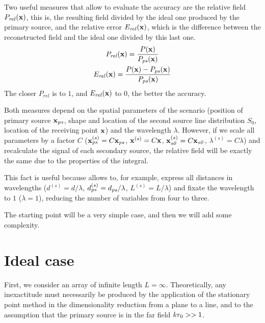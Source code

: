 Two useful measures that allow to evaluate the accuracy are the relative field $P_\mathit{rel}(\PosTheo)$, this is, the resulting field divided by the ideal one produced by the primary source, and the relative error $E_\mathit{rel}(\PosTheo)$, which is the difference between the reconstructed field and the ideal one divided by this last one.
\begin{gather}
	P_\mathit{rel}(\PosTheo) = \frac{P(\PosTheo)}{P_{\PosTheoSubInd[primarySource]}(\PosTheo)} \\
	E_\mathit{rel}(\PosTheo) = \frac{P(\PosTheo) - P_{\PosTheoSubInd[primarySource]}(\PosTheo)}{P_{\PosTheoSubInd[primarySource]}(\PosTheo)}
\end{gather}
The closer $P_\mathit{rel}$ is to $1$, and $E_\mathit{rel}(\PosTheo)$ to $0$, the better the accuracy.

Both measures depend on the spatial parameters of the scenario (position of primary source $\PosTheo[primarySource]$, shape and location of the second source line distribution $S_0$, location of the receiving point $\PosTheo$) and the wavelength $\lambda$. However, if we scale all parameters by a factor $C$ ($\PosTheo[primarySource]^{(s)} = C \PosTheo[primarySource]$, $\PosTheo^{(s)} = C\PosTheo$, $\PosTheo[section]^{(s)} = C\PosTheo[section]$, $\lambda^{(s)} = C\lambda$) and recalculate the signal of each secondary source, the relative field will be exactly the same due to the properties of the integral.

This fact is useful because allows to, for example, express all distances in wavelengths ($d^{(s)} = d/\lambda$, $d_{\PosTheoSubInd[primarySource]}^{(s)} = d_{\PosTheoSubInd[primarySource]}/\lambda$, $L^{(s)} = L/\lambda$) and fixate the wavelength to $1$ ($\lambda = 1$), reducing the number of variables from four to three. 

The starting point will be a very simple case, and then we will add some complexity.

\section{Ideal case}
First, we consider an array of infinite length $L=\infty$.
Theoretically, any inexactitude must necessarily be produced by the application of the stationary point method in the dimensionality reduction from a plane to a line, and to the assumption that the primary source is in the far field $kr_0 >> 1$.

